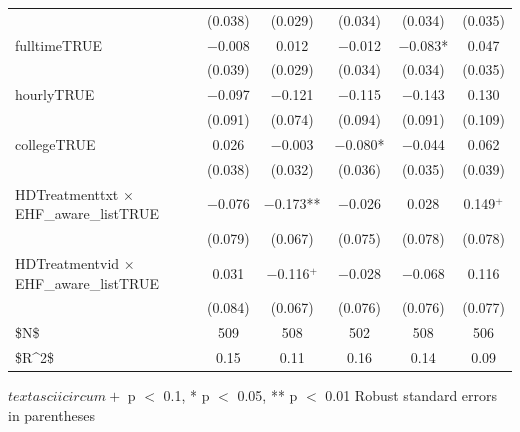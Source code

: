 \documentclass[
  11pt,
  oneside]{article}
\begin{document}
\begin{table}
\begin{threeparttable}
\begin{tabular}[t]{lccccc}
 & (\num{0.038}) & (\num{0.029}) & (\num{0.034}) & (\num{0.034}) & (\num{0.035})\\
fulltimeTRUE & \num{-0.008} & \num{0.012} & \num{-0.012} & \num{-0.083}* & \num{0.047}\\
 & (\num{0.039}) & (\num{0.029}) & (\num{0.034}) & (\num{0.034}) & (\num{0.035})\\
hourlyTRUE & \num{-0.097} & \num{-0.121} & \num{-0.115} & \num{-0.143} & \num{0.130}\\
 & (\num{0.091}) & (\num{0.074}) & (\num{0.094}) & (\num{0.091}) & (\num{0.109})\\
collegeTRUE & \num{0.026} & \num{-0.003} & \num{-0.080}* & \num{-0.044} & \num{0.062}\\
 & (\num{0.038}) & (\num{0.032}) & (\num{0.036}) & (\num{0.035}) & (\num{0.039})\\
HDTreatmenttxt × EHF\_aware\_listTRUE & \num{-0.076} & \num{-0.173}** & \num{-0.026} & \num{0.028} & \num{0.149}$^+$\\
 & (\num{0.079}) & (\num{0.067}) & (\num{0.075}) & (\num{0.078}) & (\num{0.078})\\
HDTreatmentvid × EHF\_aware\_listTRUE & \num{0.031} & \num{-0.116}$^+$ & \num{-0.028} & \num{-0.068} & \num{0.116}\\
 & (\num{0.084}) & (\num{0.067}) & (\num{0.076}) & (\num{0.076}) & (\num{0.077})\\
\midrule
\$N\$ & \num{509} & \num{508} & \num{502} & \num{508} & \num{506}\\
\$R\textasciicircum{}2\$ & \num{0.15} & \num{0.11} & \num{0.16} & \num{0.14} & \num{0.09}\\
\bottomrule
\end{tabular}
\begin{tablenotes}
\item $textasciicircum{}+$ p $<$ 0.1, * p $<$ 0.05, ** p $<$ 0.01 Robust standard errors in parentheses
\end{tablenotes}
\end{threeparttable}
\end{table}
\end{document}
